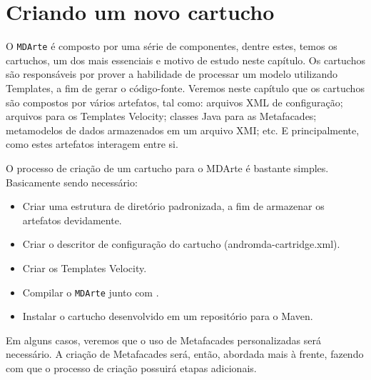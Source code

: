 \appendix
\chapter{Criando um novo cartucho}

O \texttt{MDArte} é composto por uma série de componentes, dentre estes, temos
os cartuchos, um dos mais essenciais e motivo de estudo neste capítulo. Os
cartuchos são responsáveis por prover a habilidade de processar um modelo
utilizando Templates, a fim de gerar o código-fonte. Veremos neste capítulo que
os cartuchos são compostos por vários artefatos, tal como: arquivos XML de
configuração; arquivos para os Templates Velocity; classes Java para as
Metafacades; metamodelos de dados armazenados em um arquivo XMI; etc. E
principalmente, como estes artefatos interagem entre si.

O processo de criação de um cartucho para o MDArte é bastante simples.
Basicamente sendo necessário:
\begin{itemize}
\item Criar uma estrutura de diretório padronizada, a fim de armazenar os
artefatos devidamente.
\item Criar o descritor de configuração do cartucho (andromda-cartridge.xml).
\item Criar os Templates Velocity.
\item Compilar o \texttt{MDArte} junto com .
\item Instalar o cartucho desenvolvido em um repositório para o Maven.
\end{itemize}

Em alguns casos, veremos que o uso de Metafacades personalizadas será
necessário. A criação de Metafacades será, então, abordada mais à frente,
fazendo com que o processo de criação possuirá etapas adicionais.
